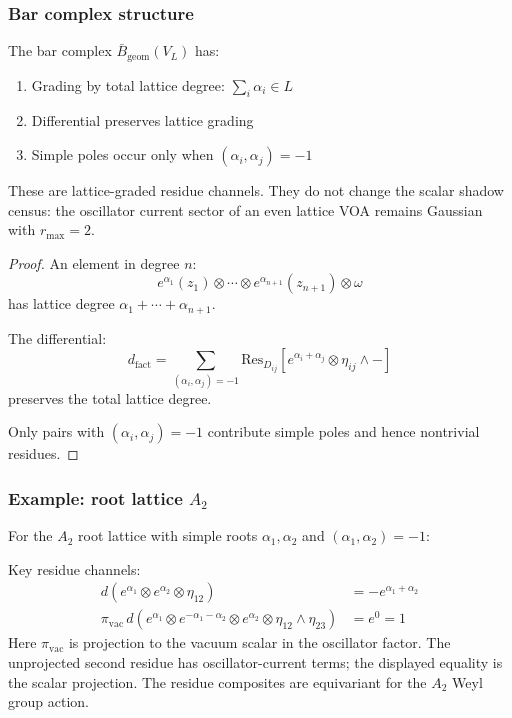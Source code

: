 \subsubsection{Bar complex structure}

\begin{theorem}
\label{thm:lattice-voa-bar}
The bar complex $\bar{B}_{\text{geom}}(V_L)$ has:
\begin{enumerate}
\item Grading by total lattice degree: $\sum_i \alpha_i \in L$
\item Differential preserves lattice grading
\item Simple poles occur only when $(\alpha_i, \alpha_j) = -1$
\end{enumerate}
These are lattice-graded residue channels. They do not change the
scalar shadow census: the oscillator current sector of an even
lattice VOA remains Gaussian with $r_{\max}=2$.
\end{theorem}

\begin{proof}
An element in degree $n$:
\[
e^{\alpha_1}(z_1) \otimes \cdots \otimes e^{\alpha_{n+1}}(z_{n+1}) \otimes \omega
\]
has lattice degree $\alpha_1 + \cdots + \alpha_{n+1}$.

The differential:
\[
d_{\text{fact}} = \sum_{(\alpha_i,\alpha_j)=-1} \text{Res}_{D_{ij}}\left[e^{\alpha_i+\alpha_j} \otimes \eta_{ij} \wedge -\right]
\]
preserves the total lattice degree.

Only pairs with $(\alpha_i, \alpha_j) = -1$ contribute simple poles and hence nontrivial residues.
\end{proof}

\subsubsection{\texorpdfstring{Example: root lattice $A_2$}{Example: root lattice A-2}}

For the $A_2$ root lattice with simple roots $\alpha_1, \alpha_2$ and $(\alpha_1, \alpha_2) = -1$:

\begin{proposition}\label{prop:A2-lattice-bar}
Key residue channels:
\begin{align}
d(e^{\alpha_1} \otimes e^{\alpha_2} \otimes \eta_{12}) &= -e^{\alpha_1+\alpha_2} \\
\pi_{\mathrm{vac}}\,
d(e^{\alpha_1} \otimes e^{-\alpha_1-\alpha_2} \otimes e^{\alpha_2}
\otimes \eta_{12} \wedge \eta_{23}) &= e^0 = 1
\end{align}
Here $\pi_{\mathrm{vac}}$ is projection to the vacuum scalar in the
oscillator factor. The unprojected second residue has oscillator-current
terms; the displayed equality is the scalar projection. The residue
composites are equivariant for the $A_2$ Weyl group action.
\end{proposition}


